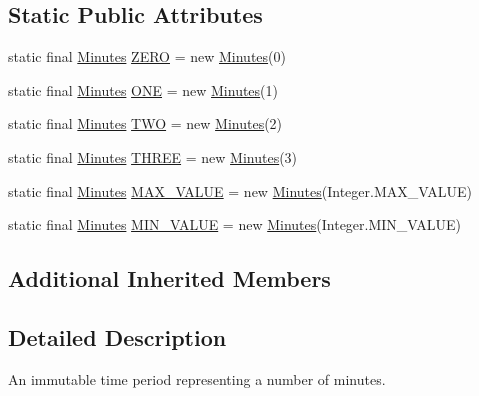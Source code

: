 \subsection*{Static Public Attributes}
\begin{DoxyCompactItemize}
\item 
static final \hyperlink{classorg_1_1joda_1_1time_1_1_minutes}{Minutes} \hyperlink{classorg_1_1joda_1_1time_1_1_minutes_a22de49cd88d138dc39faeebe27559c86}{Z\-E\-R\-O} = new \hyperlink{classorg_1_1joda_1_1time_1_1_minutes}{Minutes}(0)
\item 
static final \hyperlink{classorg_1_1joda_1_1time_1_1_minutes}{Minutes} \hyperlink{classorg_1_1joda_1_1time_1_1_minutes_a4ddf826c451836fd3b7b9c923ec0836a}{O\-N\-E} = new \hyperlink{classorg_1_1joda_1_1time_1_1_minutes}{Minutes}(1)
\item 
static final \hyperlink{classorg_1_1joda_1_1time_1_1_minutes}{Minutes} \hyperlink{classorg_1_1joda_1_1time_1_1_minutes_a82f7ec804e600b795adb609686816c6b}{T\-W\-O} = new \hyperlink{classorg_1_1joda_1_1time_1_1_minutes}{Minutes}(2)
\item 
static final \hyperlink{classorg_1_1joda_1_1time_1_1_minutes}{Minutes} \hyperlink{classorg_1_1joda_1_1time_1_1_minutes_a3fffa667e953272075c94ae0934177ba}{T\-H\-R\-E\-E} = new \hyperlink{classorg_1_1joda_1_1time_1_1_minutes}{Minutes}(3)
\item 
static final \hyperlink{classorg_1_1joda_1_1time_1_1_minutes}{Minutes} \hyperlink{classorg_1_1joda_1_1time_1_1_minutes_a68d772fe63e157c9d70332797d501d81}{M\-A\-X\-\_\-\-V\-A\-L\-U\-E} = new \hyperlink{classorg_1_1joda_1_1time_1_1_minutes}{Minutes}(Integer.\-M\-A\-X\-\_\-\-V\-A\-L\-U\-E)
\item 
static final \hyperlink{classorg_1_1joda_1_1time_1_1_minutes}{Minutes} \hyperlink{classorg_1_1joda_1_1time_1_1_minutes_ad551c2ae2977dcc792cae9e556ced258}{M\-I\-N\-\_\-\-V\-A\-L\-U\-E} = new \hyperlink{classorg_1_1joda_1_1time_1_1_minutes}{Minutes}(Integer.\-M\-I\-N\-\_\-\-V\-A\-L\-U\-E)
\end{DoxyCompactItemize}
\subsection*{Additional Inherited Members}


\subsection{Detailed Description}
An immutable time period representing a number of minutes. 

